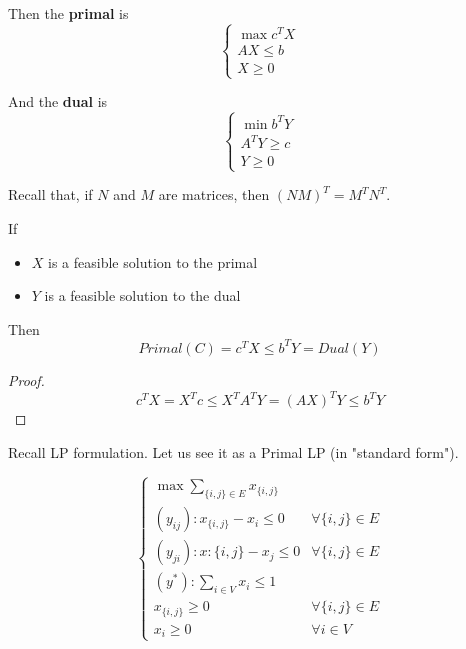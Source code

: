     Then the \textbf{primal} is
    \begin{equation}
        \begin{cases}
            \max c^T X\\
            AX \leq b\\
            X \geq 0
        \end{cases}
    \end{equation}

    And the \textbf{dual} is
    \begin{equation}
        \begin{cases}
            \min b^T Y\\
            A^T Y \geq c\\
            Y \geq 0
        \end{cases}
    \end{equation}

    Recall that, if $N$ and $M$ are matrices, then $(N M)^T = M^T N^T$.

    \begin{theorem}
        If 
        \begin{itemize}
            \item $X$ is a feasible solution to the primal
            \item $Y$ is a feasible solution to the dual
        \end{itemize}

        Then 
        \[ Primal(C) = c^T X \leq b^T Y = Dual(Y) \]
    \end{theorem}

    \begin{proof}
        \[ c^T X = X^T c \leq X^T A^T Y = (A X)^T Y \leq b^T Y \]
    \end{proof}


    Recall  LP formulation.
    Let us see it as a Primal LP (in "standard form").

    \begin{equation}
        \begin{cases}
            \max \sum_{\{i,j\} \in E} x_{\{i,j\}}\\
            (y_{ij}): x_{\{i,j\}} - x_i \leq 0  & \forall \{i,j\} \in E\\
            (y_{ji}): x:{\{i,j\}} - x_j \leq 0  & \forall \{i,j\} \in E\\
            (y^*): \sum_{i \in V} x_i \leq 1\\
            x_{\{i,j\}} \geq 0                  & \forall \{i,j\} \in E\\
            x_i \geq 0                          & \forall i \in V
        \end{cases}
    \end{equation}

